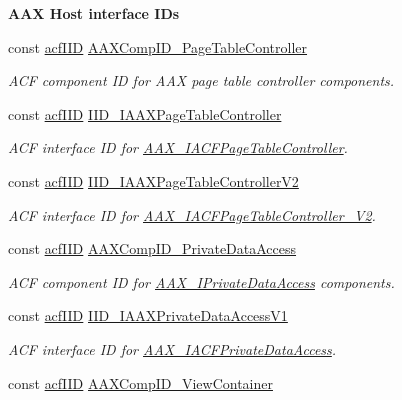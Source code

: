 \begin{Indent}{\bf A\+A\+X Host interface I\+Ds}
\begin{DoxyCompactItemize}
const \hyperlink{a00150_a59df0b41744eee7a066787aaedf97f67}{acf\+I\+I\+D} \hyperlink{a00299_afbda44f63aecda768b6935e79226ce63}{A\+A\+X\+Comp\+I\+D\+\_\+\+Page\+Table\+Controller}
\begin{DoxyCompactList}\small\item\em A\+C\+F component I\+D for A\+A\+X page table controller components. \end{DoxyCompactList}\item 
const \hyperlink{a00150_a59df0b41744eee7a066787aaedf97f67}{acf\+I\+I\+D} \hyperlink{a00299_a0bbba7e8b6a99bb68d2edcf4c1c06b44}{I\+I\+D\+\_\+\+I\+A\+A\+X\+Page\+Table\+Controller}
\begin{DoxyCompactList}\small\item\em A\+C\+F interface I\+D for \hyperlink{a00076}{A\+A\+X\+\_\+\+I\+A\+C\+F\+Page\+Table\+Controller}. \end{DoxyCompactList}\item 
const \hyperlink{a00150_a59df0b41744eee7a066787aaedf97f67}{acf\+I\+I\+D} \hyperlink{a00299_aa7c11e4b5a6663039359831c0869c0a7}{I\+I\+D\+\_\+\+I\+A\+A\+X\+Page\+Table\+Controller\+V2}
\begin{DoxyCompactList}\small\item\em A\+C\+F interface I\+D for \hyperlink{a00077}{A\+A\+X\+\_\+\+I\+A\+C\+F\+Page\+Table\+Controller\+\_\+\+V2}. \end{DoxyCompactList}\item 
const \hyperlink{a00150_a59df0b41744eee7a066787aaedf97f67}{acf\+I\+I\+D} \hyperlink{a00299_a4d947cbe546fdaa1397264c47ddb96d2}{A\+A\+X\+Comp\+I\+D\+\_\+\+Private\+Data\+Access}
\begin{DoxyCompactList}\small\item\em A\+C\+F component I\+D for \hyperlink{a00111}{A\+A\+X\+\_\+\+I\+Private\+Data\+Access} components. \end{DoxyCompactList}\item 
const \hyperlink{a00150_a59df0b41744eee7a066787aaedf97f67}{acf\+I\+I\+D} \hyperlink{a00299_aa501391f1c951a2cf295dadfea936a49}{I\+I\+D\+\_\+\+I\+A\+A\+X\+Private\+Data\+Access\+V1}
\begin{DoxyCompactList}\small\item\em A\+C\+F interface I\+D for \hyperlink{a00078}{A\+A\+X\+\_\+\+I\+A\+C\+F\+Private\+Data\+Access}. \end{DoxyCompactList}\item 
const \hyperlink{a00150_a59df0b41744eee7a066787aaedf97f67}{acf\+I\+I\+D} \hyperlink{a00299_a2e198bb97b311f9919ad1f61862be5e9}{A\+A\+X\+Comp\+I\+D\+\_\+\+View\+Container}

\end{DoxyCompactItemize}
\end{Indent}
